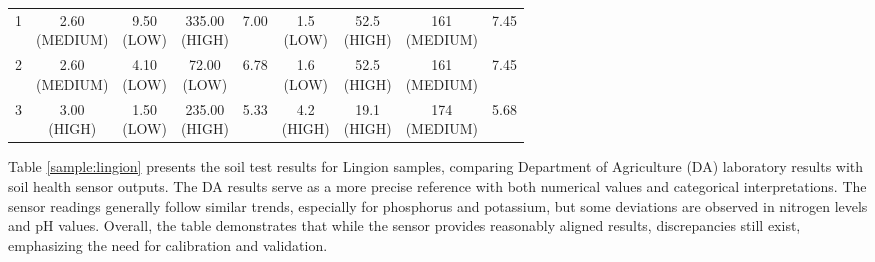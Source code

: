 {\begin{table}[htbp]
\begin{adjustbox}{max width=\textwidth}
\begin{tabular}{lcccccccc}
				1 &
				\shortstack{2.60 \\ (MEDIUM)} &
				\shortstack{9.50 \\ (LOW)} &
				\shortstack{335.00 \\ (HIGH)} &
				7.00 &
				\shortstack{1.5 \\ (LOW)} &
				\shortstack{52.5 \\ (HIGH)} &
				\shortstack{161 \\ (MEDIUM)} &
				7.45 \\
				
				2 &
				\shortstack{2.60 \\ (MEDIUM)} &
				\shortstack{4.10 \\ (LOW)} &
				\shortstack{72.00 \\ (LOW)} &
				6.78 &
				\shortstack{1.6 \\ (LOW)} &
				\shortstack{52.5 \\ (HIGH)} &
				\shortstack{161 \\ (MEDIUM)} &
				7.45 \\
				
				3 &
				\shortstack{3.00 \\ (HIGH)} &
				\shortstack{1.50 \\ (LOW)} &
				\shortstack{235.00 \\ (HIGH)} &
				5.33 &
				\shortstack{4.2 \\ (HIGH)} &
				\shortstack{19.1 \\ (HIGH)} &
				\shortstack{174 \\ (MEDIUM)} &
				5.68 \\
				
				\bottomrule
			\end{tabular}
		\end{adjustbox}
		
	\end{table}
	
	Table \ref{sample:lingion} presents the soil test results for Lingion samples, comparing Department of Agriculture (DA) laboratory results with soil health sensor outputs. The DA results serve as a more precise reference with both numerical values and categorical interpretations. The sensor readings generally follow similar trends, especially for phosphorus and potassium, but some deviations are observed in nitrogen levels and pH values. Overall, the table demonstrates that while the sensor provides reasonably aligned results, discrepancies still exist, emphasizing the need for calibration and validation.
	
}
